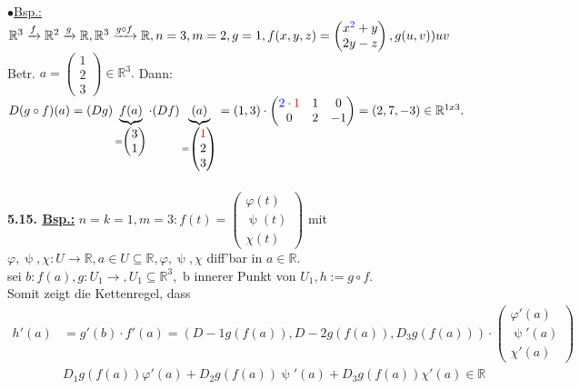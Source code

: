 \documentclass[]{scrartcl}
\begin{document}
	$\bullet$\underline{Bsp.:} 
	$\mathbb{R}^3\xrightarrow{f}\mathbb{R}^2\xrightarrow{g}\mathbb{R}, 
	\mathbb{R}^3\xrightarrow{g\circ f}\mathbb{R}, n=3, m=2, g=1, 
	f(x,y,z)=\begin{pmatrix}
		x^{\textcolor{blue}{2}}+y\\
		2y-z
	\end{pmatrix}, g(u,v))uv$\\
Betr. $a=\begin{pmatrix}
	1\\2\\3
\end{pmatrix}\in \mathbb{R}^3.$ Dann:$ D(g\circ 
f)(a)=(Dg)\underbrace{f(a)}_{=\begin{pmatrix}
	3\\1
\end{pmatrix}}\cdot(Df)\underbrace{(a)}_{=\begin{pmatrix}
	\textcolor{red}{1}\\2\\3
\end{pmatrix}}=(1,3)\cdot\begin{pmatrix}
	\textcolor{blue}{2}\cdot\textcolor{red}{1}&1&0\\
	0&2&-1
\end{pmatrix}=(2,7,-3)\in\mathbb{R}^{1 x 3}.$\\
\\
\textbf{5.15. \underline{Bsp.:}} $n=k=1, m=3: f(t)=\begin{pmatrix}
	\varphi(t)\\\uppsi(t)\\\chi(t)
\end{pmatrix}$ mit $\varphi, \uppsi, \chi:U\rightarrow\mathbb{R}, a\in U 
\subseteq\mathbb{R}, \varphi,\uppsi,\chi$ diff'bar in $a\in\mathbb{R}.$\\
sei $b:f(a), g:U_1\rightarrow, U_1\subseteq \mathbb{R}^3,$ b innerer Punkt von 
$U_1, h:=g\circ f.$\\
Somit zeigt die Kettenregel, dass\\
\begin{align}
	h'(a)&=g'(b)\cdot f'(a)=(D-1g(f(a)), D-2g(f(a)),D_3g(f(a)))\cdot 
	\begin{pmatrix}
		\varphi'(a)\\\uppsi'(a)\\\chi'(a)
	\end{pmatrix}\\
	&D_1g(f(a))\varphi'(a)+D_2g(f(a))\uppsi'(a)+D_3 g(f(a))\chi'(a)\in 
	\mathbb{R}
\end{align}\\
\end{document}
